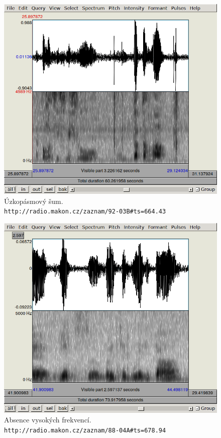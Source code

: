 \begin{figure}[htpb]
\includegraphics[scale=0.88]{rc/spectrum-narrow-92-03B.png}
\caption{
    Úzkopásmový šum.\\
    \texttt{http://radio.makon.cz/zaznam/92-03B\#ts=664.43}
}
\label{fig:spectr-narrow}
\end{figure}

\begin{figure}[htpb]
\includegraphics[scale=0.88]{rc/spectrum-nohighs-88-04A.png}
\caption{
    Absence vysokých frekvencí.\\
    \texttt{http://radio.makon.cz/zaznam/88-04A\#ts=678.94}
}
\label{fig:spectr-nohi}
\end{figure}

